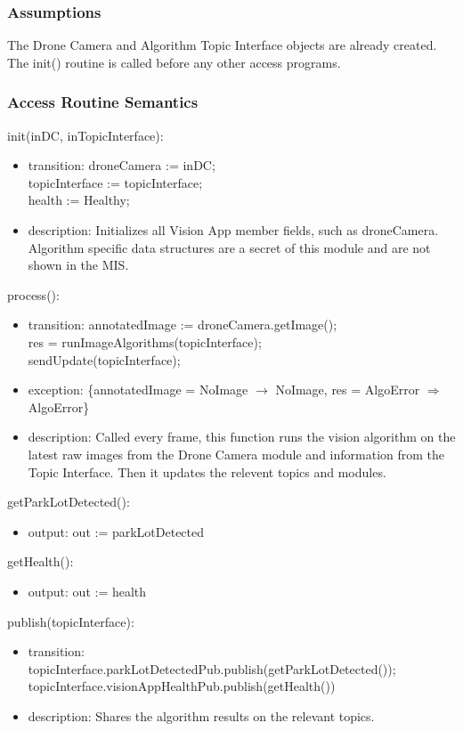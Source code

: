 \documentclass[12pt, titlepage]{article}
\begin{document}
\subsubsection{Assumptions}
The Drone Camera and Algorithm Topic Interface objects are already created.
The init() routine is called before any other access programs.
\subsubsection{Access Routine Semantics}
\noindent init(inDC, inTopicInterface):
\begin{itemize}
\item transition:  droneCamera := inDC; \\  topicInterface := topicInterface; \\ health := Healthy;
\item description: Initializes all Vision App member fields, such as droneCamera. Algorithm specific data structures are a secret of this module and are not shown in the MIS.
\end{itemize}
\noindent process():
\begin{itemize}
\item transition: annotatedImage := droneCamera.getImage(); \\
res = runImageAlgorithms(topicInterface); \\ sendUpdate(topicInterface);
\item exception: \{annotatedImage = NoImage $\rightarrow$ NoImage, res = AlgoError $\Rightarrow$ AlgoError\} \\
\item description: Called every frame, this function runs the vision algorithm on the latest raw images from the Drone Camera module and information from the Topic Interface. Then it updates the relevent topics and modules.
\end{itemize}
\noindent getParkLotDetected():
\begin{itemize}
\item output: out := parkLotDetected 
\end{itemize}
\noindent getHealth():
\begin{itemize}
\item output: out := health 
\end{itemize}
\noindent publish(topicInterface):
\begin{itemize}
\item transition: topicInterface.parkLotDetectedPub.publish(getParkLotDetected()); \\ topicInterface.visionAppHealthPub.publish(getHealth())
\item description: Shares the algorithm results on the relevant topics.
\end{itemize}
\end{document}
